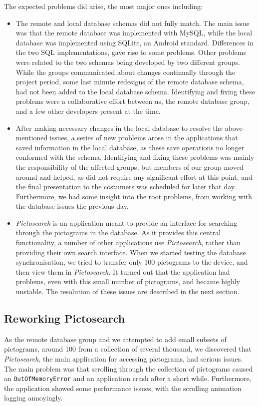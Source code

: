 The expected problems did arise, the most major ones including:
\begin{itemize}
	\item The remote and local database schemas did not fully match. 
	The main issue was that the remote database was implemented with MySQL, while the local database was implemented using SQLite, an Android standard. 
	Differences in the two SQL implementations, gave rise to some problems. 
	Other problems were related to the two schemas being developed by two different groups.
	While the groups communicated about changes continually through the project period, some last minute redesigns of the remote database schema, had not been added to the local database schema.
	Identifying and fixing these problems were a collaborative effort between us, the remote database group, and a few other developers present at the time. 
	\item After making necessary changes in the local database to resolve the above-mentioned issues, a series of new problems arose in the applications that saved information in the local database, as these save operations no longer conformed with the schema. 
	Identifying and fixing these problems was mainly the responsibility of the affected groups, but members of our group moved around and helped, as \launcher did not require any significant effort at this point, and the final presentation to the costumers was scheduled for later that day. 
	Furthermore, we had some insight into the root problems, from working with the database issues the previous day.
	\item \textit{Pictosearch} is an application meant to provide an interface for searching through the pictograms in the database.
	As it provides this central functionality, a number of other applications use \textit{Pictosearch}, rather than providing their own search interface.
	When we started testing the database synchronisation, we tried to transfer only 100 pictograms to the device, and then view them in \textit{Pictosearch}.
	It turned out that the application had problems, even with this small number of pictograms, and became highly unstable. 
	The resolution of these issues are described in the next section.
\end{itemize}

\subsection{Reworking Pictosearch}
\label{sec:collab:remotedb:pictosearch}
As the remote database group and we attempted to add small subsets of pictograms, around 100 from a collection of several thousand, we discovered that \textit{Pictosearch}, the main application for accessing pictograms, had serious issues.
The main problem was that scrolling through the collection of pictograms caused an \lstinline!OutOfMemoryError! and an application crash after a short while.
Furthermore, the application showed some performance issues, with the scrolling animation lagging annoyingly.

